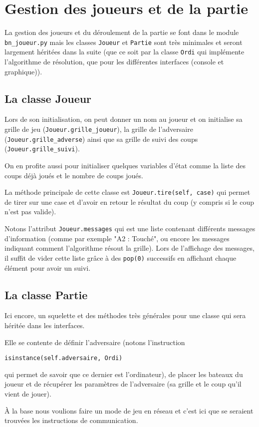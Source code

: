 \chapter{Gestion des joueurs et de la partie}

La gestion des joueurs et du déroulement de la partie se font dans le module \texttt{bn\_joueur.py} mais les classes \texttt{Joueur} et \texttt{Partie} sont très minimales et seront largement héritées dans la suite (que ce soit par la classe \texttt{Ordi} qui implémente l'algorithme de résolution, que pour les différentes interfaces (console et graphique)).

\section{La classe Joueur}
Lors de son initialisation, on peut donner un nom au joueur et on initialise sa grille de jeu (\texttt{Joueur.grille\_joueur}), la grille de l'adversaire (\texttt{Joueur.grille\_adverse}) ainsi que sa grille de suivi des coups (\texttt{Joueur.grille\_suivi}).

On en profite aussi pour initialiser quelques variables d'état comme la liste des coups déjà joués et le nombre de coups joués.

La méthode principale de cette classe est \texttt{Joueur.tire(self, case)} qui permet de tirer sur une case et d'avoir en retour le résultat du coup (y compris si le coup n'est pas valide).

Notons l'attribut \texttt{Joueur.messages} qui est une liste contenant différents messages d'information (comme par exemple "A2 : Touché", ou encore les messages indiquant comment l'algorithme résout la grille). Lors de l'affichage des messages, il suffit de vider cette liste grâce à des \texttt{pop(0)} successifs en affichant chaque élément pour avoir un suivi.

\section{La classe Partie}
Ici encore, un squelette et des méthodes très générales pour une classe qui sera héritée dans les interfaces.

Elle se contente de définir l'adversaire (notons l'instruction \begin{center}
\texttt{isinstance(self.adversaire, Ordi)}
\end{center} qui permet de savoir que ce dernier est l'ordinateur), de placer les bateaux du joueur et de récupérer les paramètres de l'adversaire (sa grille et le coup qu'il vient de jouer).

À la base nous voulions faire un mode de jeu en réseau et c'est ici que se seraient trouvées les instructions de communication.
